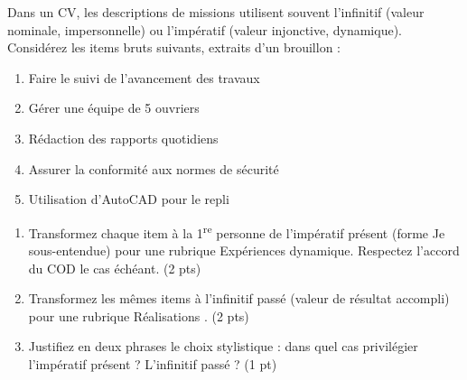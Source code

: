 \documentclass[11pt]{article}
\begin{document}
\begin{exercice}
Dans un CV, les descriptions de missions utilisent souvent l'infinitif (valeur nominale, impersonnelle) ou l'impératif (valeur injonctive, dynamique). Considérez les items bruts suivants, extraits d'un brouillon :
\begin{enumerate}
    \item \og Faire le suivi de l'avancement des travaux \fg
    \item \og Gérer une équipe de 5 ouvriers \fg
    \item \og Rédaction des rapports quotidiens \fg
    \item \og Assurer la conformité aux normes de sécurité \fg
    \item \og Utilisation d'AutoCAD pour le repli \fg
\end{enumerate}

\begin{enumerate}
    \item Transformez chaque item à la 1\textsuperscript{re} personne de l'impératif présent (forme \og Je \fg sous-entendue) pour une rubrique \og Expériences \fg dynamique. Respectez l'accord du COD le cas échéant. \hfill (2 pts)
    \item Transformez les mêmes items à l'infinitif passé (valeur de résultat accompli) pour une rubrique \og Réalisations \fg. \hfill (2 pts)
    \item Justifiez en deux phrases le choix stylistique : dans quel cas privilégier l'impératif présent ? L'infinitif passé ? \hfill (1 pt)
\end{enumerate}
\end{exercice}
\end{document}
